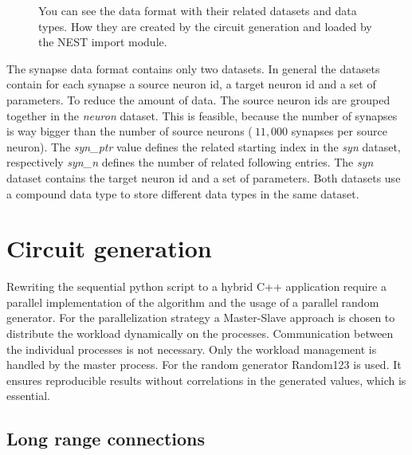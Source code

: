 \begin{figure}[ht!]
\begin{center}
{       }
    	   \end{center}
    	\caption{%
        You can see the data format with their related datasets and data types. 
        How they are created by the circuit generation and loaded by the NEST import module.
     }%
   \label{fig:atlas}
   \end{figure}
The synapse data format contains only two datasets. In general the datasets contain for each synapse
a source neuron id, a target neuron id and a set of parameters. To reduce the amount of data.
The source neuron ids are grouped together in the \emph{neuron} dataset. This is feasible, because
the number of synapses is way bigger than the number of source neurons ($~11,000$ synapses per source neuron).
The \emph{syn\_ptr} value defines the related starting index in the \emph{syn} dataset,
respectively \emph{syn\_n} defines the number of related following entries.
The \emph{syn} dataset contains the target neuron id and a set of parameters.
Both datasets use a compound data type to store different data types in the same dataset.

\newpage
\section{Circuit generation}
Rewriting the sequential python script to a hybrid C++ application require a parallel implementation of the algorithm and the usage of 
a parallel random generator. For the parallelization strategy a Master-Slave approach is chosen to distribute the workload dynamically on the processes.
Communication between the individual processes is not necessary. Only the workload management is handled by the master process.
For the random generator Random123\cite{salmon2011parallel} is used.
It ensures reproducible results without correlations in the generated values, which is essential.




\subsection{Long range connections}

